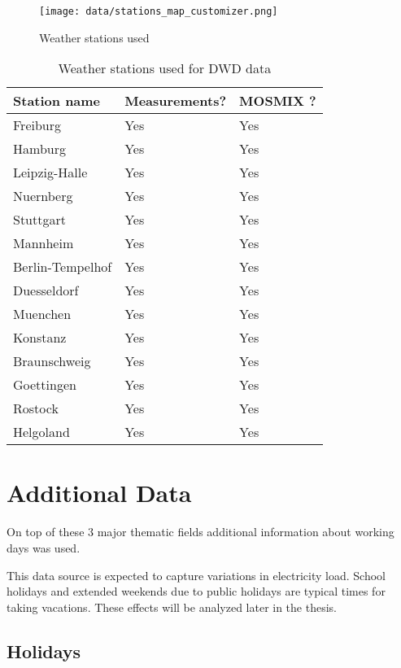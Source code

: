 \documentclass[class=scrbook, crop=false]{standalone}
\begin{document}
\begin{figure}[ht]
            \centering
            \texttt{[image: data/stations\_map\_customizer.png]}
            \caption[Weather stations used]{Weather stations used}
            \label{fig::weather_stations}
 \end{figure}
 

\begin{table}[]
\centering
\begin{tabular}{l|l|l}
Station name & Measurements? & MOSMIX ?\\\hline
   Freiburg&Yes&Yes\\
   Hamburg&Yes&Yes\\
    Leipzig-Halle&Yes&Yes\\
    Nuernberg&Yes&Yes\\
    Stuttgart&Yes&Yes\\
    Mannheim&Yes&Yes\\
    Berlin-Tempelhof&Yes&Yes\\
    Duesseldorf&Yes&Yes\\
    Muenchen&Yes&Yes\\
   Konstanz&Yes&Yes\\
   Braunschweig&Yes&Yes\\
   Goettingen&Yes&Yes\\
   Rostock&Yes&Yes\\
   Helgoland&Yes&Yes   
\end{tabular}
\caption{Weather stations used for DWD data}
\label{Table::Weather_Stations}
\end{table}



 
 

\section{Additional Data}
\label{Section::Additional_Data}
On top of these 3 major thematic fields additional information about working days was used. 

This data source is expected to capture variations in electricity load.
School holidays and extended weekends due to public holidays are typical times for taking vacations.
These effects will be analyzed later in the thesis.

\subsection{Holidays}
\end{document}
